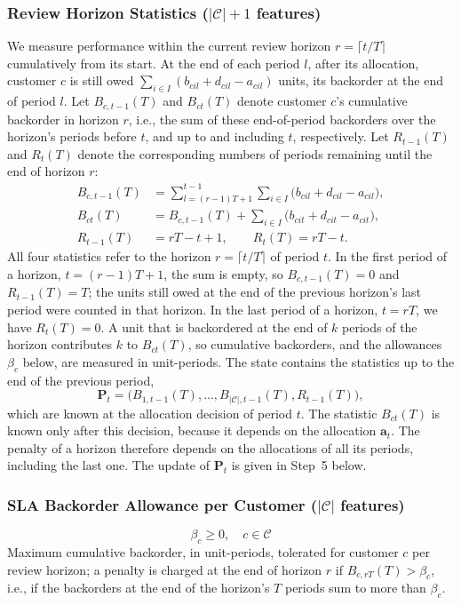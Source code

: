 \documentclass[11pt, a4paper]{article}
\theoremstyle{definition}
\theoremstyle{remark}
\begin{document}
\subsubsection{Review Horizon Statistics ($|\mathcal{C}| + 1$ features)}
\label{sec:horizonstats}
We measure performance within the current review horizon $r = \lceil t/T \rceil$ cumulatively from its start. At the end of each period $l$, after its allocation, customer $c$ is still owed $\sum_{i \in I} (b_{cil} + d_{cil} - a_{cil})$ units, its backorder at the end of period $l$. Let $B_{c,t-1}(T)$ and $B_{ct}(T)$ denote customer $c$'s cumulative backorder in horizon $r$, i.e., the sum of these end-of-period backorders over the horizon's periods before $t$, and up to and including $t$, respectively. Let $R_{t-1}(T)$ and $R_t(T)$ denote the corresponding numbers of periods remaining until the end of horizon $r$:
\begin{align}
    B_{c,t-1}(T) &= \sum_{l=(r-1)T+1}^{t-1} \sum_{i \in I} \big(b_{cil} + d_{cil} - a_{cil}\big), \\
    B_{ct}(T) &= B_{c,t-1}(T) + \sum_{i \in I} \big(b_{cit} + d_{cit} - a_{cit}\big), \\
    R_{t-1}(T) &= rT - t + 1, \qquad R_t(T) = rT - t.
\end{align}
All four statistics refer to the horizon $r = \lceil t/T \rceil$ of period $t$. In the first period of a horizon, $t = (r-1)T+1$, the sum is empty, so $B_{c,t-1}(T) = 0$ and $R_{t-1}(T) = T$; the units still owed at the end of the previous horizon's last period were counted in that horizon. In the last period of a horizon, $t = rT$, we have $R_t(T) = 0$. A unit that is backordered at the end of $k$ periods of the horizon contributes $k$ to $B_{ct}(T)$, so cumulative backorders, and the allowances $\beta_c$ below, are measured in unit-periods. The state contains the statistics up to the end of the previous period,
\begin{equation}
    \mathbf{P}_t = \big(B_{1,t-1}(T), \ldots, B_{|\mathcal{C}|,t-1}(T), R_{t-1}(T)\big),
\end{equation}
which are known at the allocation decision of period $t$. The statistic $B_{ct}(T)$ is known only after this decision, because it depends on the allocation $\mathbf{a}_t$. The penalty of a horizon therefore depends on the allocations of all its periods, including the last one. The update of $\mathbf{P}_t$ is given in Step~5 below.

\subsubsection{SLA Backorder Allowance per Customer ($|\mathcal{C}|$ features)}
\begin{equation}
    \beta_c \geq 0, \quad c \in \mathcal{C}
\end{equation}
Maximum cumulative backorder, in unit-periods, tolerated for customer $c$ per review horizon; a penalty is charged at the end of horizon $r$ if $B_{c,rT}(T) > \beta_c$, i.e., if the backorders at the end of the horizon's $T$ periods sum to more than $\beta_c$.
\end{document}
